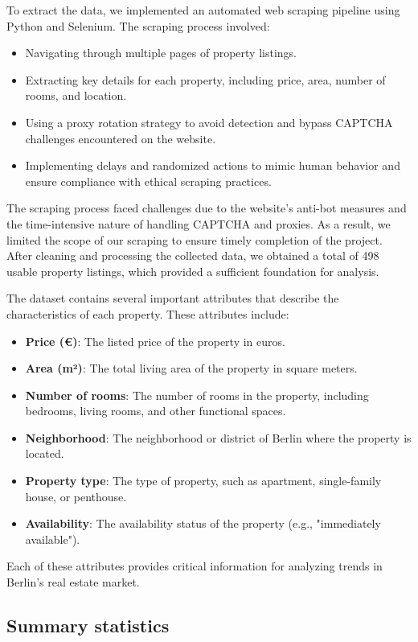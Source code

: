 \documentclass[twocolumn]{article}
\begin{document}
To extract the data, we implemented an automated web scraping pipeline using Python and Selenium. The scraping process involved:
\begin{itemize}
    \item Navigating through multiple pages of property listings.
    \item Extracting key details for each property, including price, area, number of rooms, and location.
    \item Using a proxy rotation strategy to avoid detection and bypass CAPTCHA challenges encountered on the website.
    \item Implementing delays and randomized actions to mimic human behavior and ensure compliance with ethical scraping practices.
\end{itemize}

The scraping process faced challenges due to the website's anti-bot measures and the time-intensive nature of handling CAPTCHA and proxies. As a result, we limited the scope of our scraping to ensure timely completion of the project. After cleaning and processing the collected data, we obtained a total of 498 usable property listings, which provided a sufficient foundation for analysis.

The dataset contains several important attributes that describe the characteristics of each property. These attributes include:
\begin{itemize}
    \item \textbf{Price (€)}: The listed price of the property in euros.
    \item \textbf{Area (m²)}: The total living area of the property in square meters.
    \item \textbf{Number of rooms}: The number of rooms in the property, including bedrooms, living rooms, and other functional spaces.
    \item \textbf{Neighborhood}: The neighborhood or district of Berlin where the property is located.
    \item \textbf{Property type}: The type of property, such as apartment, single-family house, or penthouse.
    \item \textbf{Availability}: The availability status of the property (e.g., "immediately available").
\end{itemize}
Each of these attributes provides critical information for analyzing trends in Berlin's real estate market.
\subsection{Summary statistics}
\end{document}
